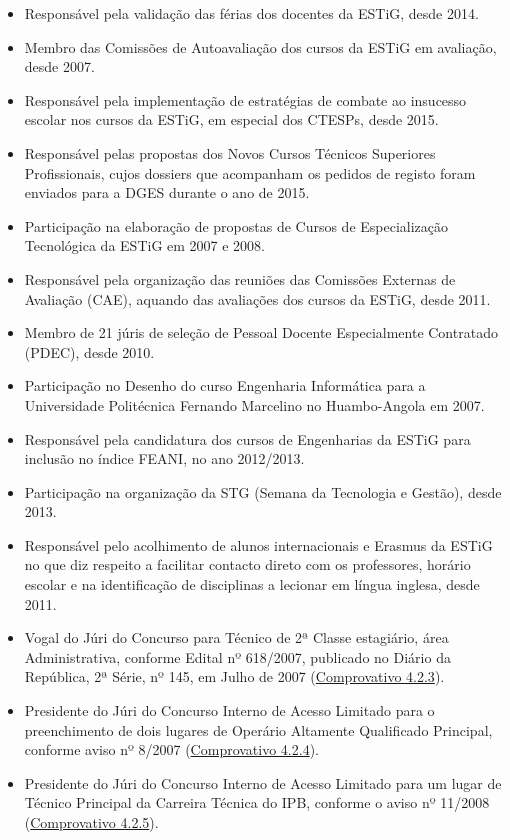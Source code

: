 \documentclass[11pt]{article}
\begin{document}
\begin{itemize}
\item {Responsável pela validação das férias dos docentes da ESTiG, desde 2014. }
\item {Membro das Comissões de Autoavaliação dos cursos da ESTiG em avaliação, desde 2007. }
\item {Responsável pela implementação de estratégias de combate ao insucesso escolar nos cursos da ESTiG, em especial dos CTESPs, desde 2015. }
\item {Responsável pelas propostas dos Novos Cursos Técnicos Superiores Profissionais, cujos dossiers que acompanham os pedidos de registo foram enviados para a DGES durante o ano de 2015. }
\item {Participação na elaboração de propostas de Cursos de Especialização Tecnológica da ESTiG em 2007 e 2008.}
\item {Responsável pela organização das reuniões das Comissões Externas de Avaliação (CAE), aquando das avaliações dos cursos da ESTiG, desde 2011. }
\item {Membro de 21 júris de seleção de Pessoal Docente Especialmente Contratado (PDEC), desde 2010. }
\item {Participação no Desenho do curso Engenharia Informática para a Universidade Politécnica Fernando Marcelino no Huambo-Angola em 2007.}
\item {Responsável pela candidatura dos cursos de Engenharias da ESTiG para inclusão no índice FEANI, no ano 2012/2013. }
\item {Participação na organização da STG (Semana da Tecnologia e Gestão), desde 2013. }
\item {Responsável pelo acolhimento de alunos internacionais e Erasmus da ESTiG no que diz respeito a facilitar contacto direto com os professores, horário escolar e na identificação de disciplinas a lecionar em língua inglesa, desde 2011.}
\item {Vogal do Júri do Concurso para Técnico de 2ª Classe estagiário, área Administrativa, conforme Edital nº 618/2007, publicado no Diário da República, 2ª Série, nº 145, em Julho de 2007 (\href{run:MissaoIPBoutros/Tecnico2Classe.pdf}{Comprovativo 4.2.3}).}
\item {Presidente do Júri do Concurso Interno de Acesso Limitado para o preenchimento de dois lugares de Operário Altamente Qualificado Principal, conforme aviso nº 8/2007 (\href{run:MissaoIPBoutros/Operario.pdf}{Comprovativo 4.2.4}).}
\item {Presidente do Júri do Concurso Interno de Acesso Limitado para um lugar de Técnico Principal da Carreira Técnica do IPB, conforme o aviso nº 11/2008 (\href{run:MissaoIPBoutros/TecnicoPrincipal.pdf}{Comprovativo 4.2.5}).}

\end{itemize}
\end{document}
